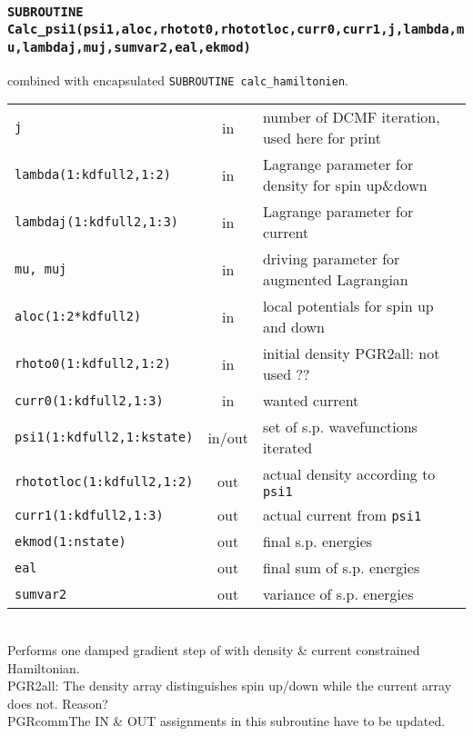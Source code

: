 \documentclass[final,1p]{elsarticle}
\newcommand{\PGRcomm}[1]{{\color{blue}\small PGR2all: #1}}
\begin{document}
\subsubsection*{\tt SUBROUTINE
  Calc\_psi1(psi1,aloc,rhotot0,rhototloc,curr0,curr1,j,lambda,mu,lambdaj,muj,sumvar2,eal,ekmod)}
\noindent
combined with encapsulated {\tt SUBROUTINE calc\_hamiltonien}.
\\
\begin{tabular}{lcl}
 {\tt j} & in & number of DCMF iteration, used here for print\\
 {\tt lambda(1:kdfull2,1:2)} & in & Lagrange parameter for density for
 spin up\&down\\
 {\tt lambdaj(1:kdfull2,1:3)} & in & Lagrange parameter for current\\
 {\tt mu, muj} & in & driving parameter for augmented Lagrangian\\
 {\tt aloc(1:2*kdfull2)} & in & local potentials for spin up and down\\
 {\tt rhoto0(1:kdfull2,1:2)} & in & initial density \PGRcomm{not used ??}\\
 {\tt curr0(1:kdfull2,1:3)} & in & wanted current \\
 {\tt psi1(1:kdfull2,1:kstate)} & in/out & set of s.p. wavefunctions iterated\\
 {\tt rhototloc(1:kdfull2,1:2)} & out & actual density according to {\tt psi1}\\
 {\tt curr1(1:kdfull2,1:3)} & out & actual current from {\tt psi1}\\
 {\tt ekmod(1:nstate)} & out & final s.p. energies\\
 {\tt eal} & out & final sum of s.p. energies\\
 {\tt sumvar2} & out & variance of s.p. energies\\
\end{tabular}
\\[4pt]
Performs one damped gradient step of with density \& current
constrained Hamiltonian.
\\
\PGRcomm{The density array distinguishes spin up/down while the
  current array does not. Reason?}
\\
PGRcomm{The IN \& OUT assignments in this subroutine have to be updated.}
\end{document}
